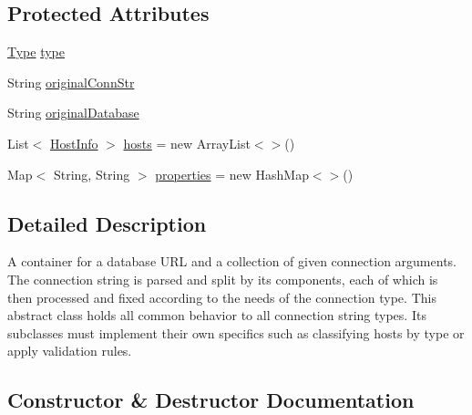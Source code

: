 \subsection*{Protected Attributes}
\begin{DoxyCompactItemize}
\item 
\mbox{\hyperlink{enumcom_1_1mysql_1_1cj_1_1conf_1_1_connection_url_1_1_type}{Type}} \mbox{\hyperlink{classcom_1_1mysql_1_1cj_1_1conf_1_1_connection_url_a7086957f46b62fc28263e76fb9159a3c}{type}}
\item 
String \mbox{\hyperlink{classcom_1_1mysql_1_1cj_1_1conf_1_1_connection_url_acb1dfbbdde68f9e171c3a525d3763801}{original\+Conn\+Str}}
\item 
String \mbox{\hyperlink{classcom_1_1mysql_1_1cj_1_1conf_1_1_connection_url_a73a936ed6806d19dd308b401cb8f160c}{original\+Database}}
\item 
List$<$ \mbox{\hyperlink{classcom_1_1mysql_1_1cj_1_1conf_1_1_host_info}{Host\+Info}} $>$ \mbox{\hyperlink{classcom_1_1mysql_1_1cj_1_1conf_1_1_connection_url_ab774f53dab294218bc6b2cf1af73a905}{hosts}} = new Array\+List$<$$>$()
\item 
Map$<$ String, String $>$ \mbox{\hyperlink{classcom_1_1mysql_1_1cj_1_1conf_1_1_connection_url_afc53ba40da35bf161d2df6fbd785b09b}{properties}} = new Hash\+Map$<$$>$()
\end{DoxyCompactItemize}


\subsection{Detailed Description}
A container for a database U\+RL and a collection of given connection arguments. The connection string is parsed and split by its components, each of which is then processed and fixed according to the needs of the connection type. This abstract class holds all common behavior to all connection string types. Its subclasses must implement their own specifics such as classifying hosts by type or apply validation rules. 

\subsection{Constructor \& Destructor Documentation}
\mbox{\label{classcom_1_1mysql_1_1cj_1_1conf_1_1_connection_url_ad72b3641e2d853e94c369c4706eb5c8b}} 
